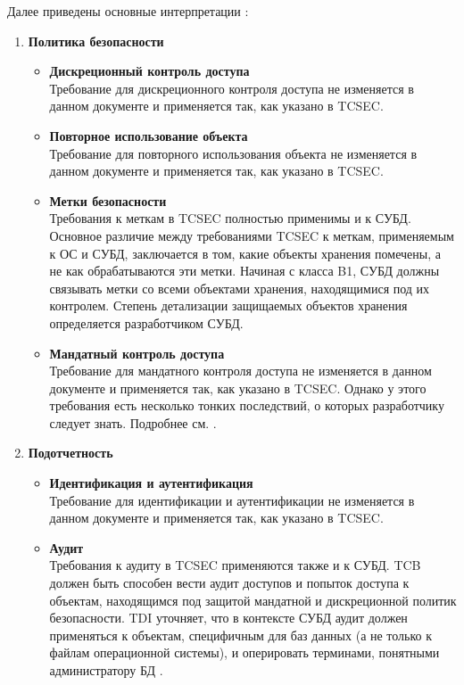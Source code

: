 Далее приведены основные интерпретации \cite{PurpleBook}:
\begin{enumerate}
	\item \textbf{Политика безопасности}
	\begin{itemize}
		\item \textbf{Дискреционный контроль доступа}\\
		Требование для дискреционного контроля доступа не изменяется в данном документе и применяется так, как указано в TCSEC.
		\item \textbf{Повторное использование объекта}\\
		Требование для повторного использования объекта не изменяется в данном документе и применяется так, как указано в TCSEC.
		\item \textbf{Метки безопасности}\\
		Требования к меткам в TCSEC полностью применимы и к СУБД. Основное различие между требованиями TCSEC к меткам, применяемым к ОС и СУБД, заключается в том, какие объекты хранения помечены, а не как обрабатываются эти метки.
		Начиная с класса B1, СУБД должны связывать метки со всеми объектами хранения, находящимися под их контролем. Степень детализации защищаемых объектов хранения определяется разработчиком СУБД.
		\item \textbf{Мандатный контроль доступа}\\
		Требование для мандатного контроля доступа не изменяется в данном документе и применяется так, как указано в TCSEC. Однако у этого требования есть несколько тонких последствий, о которых разработчику следует знать. Подробнее см. \cite[Appendix B, item 8]{PurpleBook}.
	\end{itemize}
	\item \textbf{Подотчетность}
	\begin{itemize}
		\item \textbf{Идентификация и аутентификация}\\
		Требование для идентификации и аутентификации не изменяется в данном документе и применяется так, как указано в TCSEC.
		\item \textbf{Аудит}\\
		Требования к аудиту в TCSEC применяются также и к СУБД. TCB должен быть способен вести аудит доступов и попыток доступа к объектам, находящимся под защитой мандатной и дискреционной политик безопасности. TDI уточняет, что в контексте СУБД аудит должен применяться к объектам, специфичным для баз данных (а не только к файлам операционной системы), и оперировать терминами, понятными администратору БД \cite[IR-4]{PurpleBook}.

\end{itemize}
\end{enumerate}
